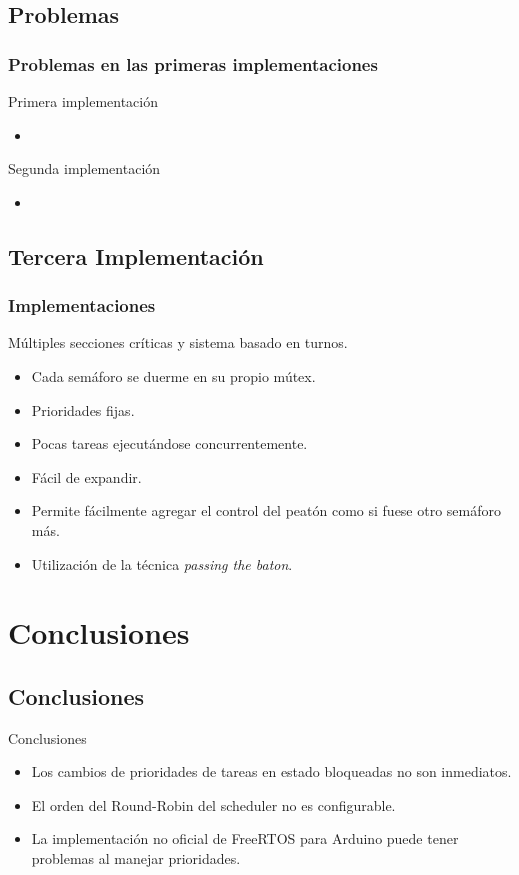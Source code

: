 \subsection{Problemas}
\begin{frame}
\frametitle{Problemas en las primeras implementaciones}
\begin{block}{Primera implementación}
	\begin{itemize}
		\item
	\end{itemize}
\end{block}
\begin{block}{Segunda implementación}
	\begin{itemize}
		\item
	\end{itemize}
\end{block}
\end{frame}

\subsection{Tercera Implementación}
\begin{frame}
\frametitle{Implementaciones}
\begin{block}{Múltiples secciones críticas y sistema basado en turnos.}
	\begin{itemize}
		\item Cada semáforo se duerme en su propio mútex.
		\item Prioridades fijas.
		\item Pocas tareas ejecutándose concurrentemente.
		\item Fácil de expandir.
		\item Permite fácilmente agregar el control del peatón como si fuese otro semáforo más.
		\item Utilización de la técnica \emph{passing the baton}.
	\end{itemize}
\end{block}
\end{frame}

\section{Conclusiones}

\subsection{Conclusiones}
\begin{frame}
	\begin{block}{Conclusiones}
		\begin{itemize}
			\item Los cambios de prioridades de tareas en estado bloqueadas no son inmediatos.
			\item El orden del Round-Robin del scheduler no es configurable.
			\item La implementación no oficial de FreeRTOS para Arduino puede tener problemas al manejar prioridades.
		\end{itemize}
	\end{block}
\end{frame}